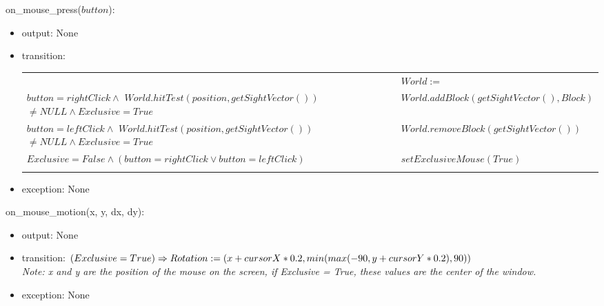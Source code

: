 \documentclass[12pt]{article}
\begin{document}
\noindent on\_mouse\_press($button$):
\begin{itemize}
\item output: None
\item transition:

\begin{tabular}{|p{8cm}|l|}
\hhline{~|-|}
\multicolumn{1}{r|}{} & \multicolumn{1}{l|}{$World :=$}\\
\hhline{|-|-|}
$button = rightClick \land $
$World.hitTest(position, getSightVector())$
$\ne NULL \land Exclusive = True$ & $World.addBlock(getSightVector(), Block)$\\
\hhline{|-|-|}
$button = leftClick  \land $
$World.hitTest(position, getSightVector())$
$\ne NULL \land Exclusive = True$ & $World.removeBlock(getSightVector())$\\
\hhline{|-|-|}
$Exclusive = False \land (button = rightClick \lor
button = leftClick)$  & $setExclusiveMouse(True)$\\
\hhline{|-|-|}
\end{tabular}
\item exception: None \\
\end{itemize}

\noindent on\_mouse\_motion(x, y, dx, dy):
\begin{itemize}
\item output: None 
\item transition: $(Exclusive = True) \Rightarrow \\Rotation := (x + cursorX * 0.2, min(max(-90, y + cursorY*0.2), 90))$ \\
\textit{Note: x and y are the position of the mouse on the screen, if Exclusive = True, these values are the center of the window.}
\item exception: None\\
\end{itemize}
\end{document}
